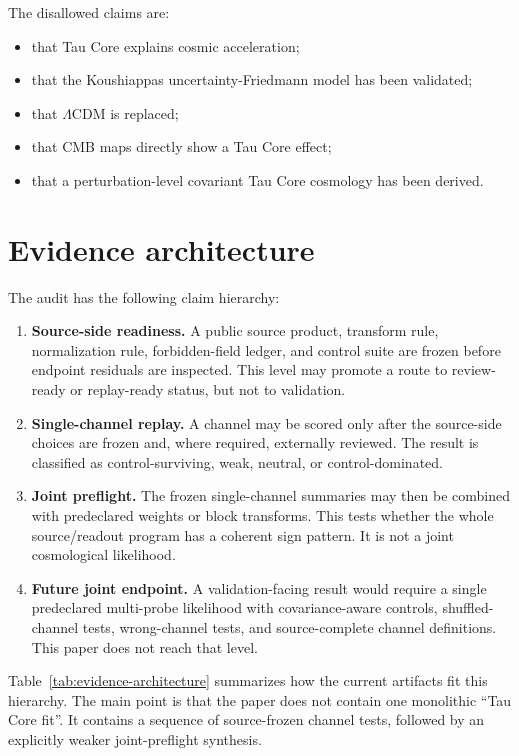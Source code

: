 \documentclass[11pt]{article}
\begin{document}
The disallowed claims are:

\begin{itemize}[leftmargin=1.2em]
\item that Tau Core explains cosmic acceleration;
\item that the Koushiappas uncertainty-Friedmann model has been validated;
\item that \(\Lambda\)CDM is replaced;
\item that CMB maps directly show a Tau Core effect;
\item that a perturbation-level covariant Tau Core cosmology has been derived.
\end{itemize}

\section{Evidence architecture}

The audit has the following claim hierarchy:

\begin{enumerate}[leftmargin=1.5em]
\item \textbf{Source-side readiness.}  A public source product, transform rule,
normalization rule, forbidden-field ledger, and control suite are frozen before
endpoint residuals are inspected.  This level may promote a route to
review-ready or replay-ready status, but not to validation.
\item \textbf{Single-channel replay.}  A channel may be scored only after the
source-side choices are frozen and, where required, externally reviewed.  The
result is classified as control-surviving, weak, neutral, or control-dominated.
\item \textbf{Joint preflight.}  The frozen single-channel summaries may then
be combined with predeclared weights or block transforms.  This tests whether
the whole source/readout program has a coherent sign pattern.  It is not a
joint cosmological likelihood.
\item \textbf{Future joint endpoint.}  A validation-facing result would require
a single predeclared multi-probe likelihood with covariance-aware controls,
shuffled-channel tests, wrong-channel tests, and source-complete channel
definitions.  This paper does not reach that level.
\end{enumerate}

Table~\ref{tab:evidence-architecture} summarizes how the current artifacts fit
this hierarchy.  The main point is that the paper does not contain one
monolithic ``Tau Core fit''.  It contains a sequence of source-frozen channel
tests, followed by an explicitly weaker joint-preflight synthesis.
\end{document}
